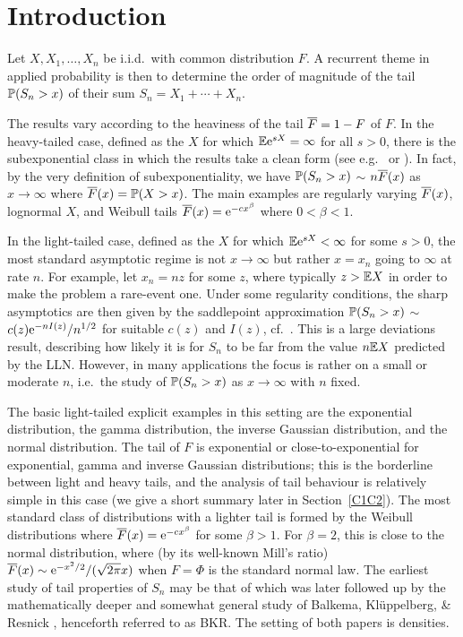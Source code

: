 \section{Introduction}\label{S:Intr}

Let $X,X_1,\ldots,X_n$ be i.i.d.\ with common distribution $F$. A recurrent theme in applied probability is then
to determine the order of magnitude of the tail $\mathbb{P}(S_n>x)$ of their sum $S_n=X_1+\cdots+X_n$.

The results vary according to the heaviness  of the tail $\overline F=1-F$ of $F$. In the heavy-tailed case, defined as the $X$ for which $\mathbb{E}\mathrm{e}^{sX}=\infty$ for all $s>0$, there is the subexponential class in which the results take a clean form (see e.g.\ \cite{EKM} or \cite{asmussen2010ruin}). In fact, by the
very definition of subexponentiality, we have $\mathbb{P}(S_n>x)$ $\sim$ $n\overline F(x)$ as $x\to\infty$ where $\overline F(x)=\mathbb{P}(X>x)$. The main examples are regularly varying $\overline F(x)$, lognormal $X$, and Weibull tails $\overline F(x)=\mathrm{e}^{-cx^\beta}$ where $0<\beta<1$.

In the light-tailed case, defined as the $X$ for which $\mathbb{E}\mathrm{e}^{sX}<\infty$ for some $s>0$, the most standard asymptotic regime is not $x\to\infty$ but rather
$x=x_n$ going to $\infty$ at rate $n$. For example, let $x_n=nz$ for some $z$, where typically $z>\mathbb{E} X$ in order to make the problem a rare-event one.
Under some regularity conditions, the sharp asymptotics are then given by the saddlepoint approximation $\mathbb{P}(S_n>x)$ $\sim$
$c(z)\mathrm{e}^{-nI(z)}/n^{1/2}$ for suitable $c(z)$ and $I(z)$, cf.\ \cite{JLJ}. This is a large deviations result, describing how likely
it is for $S_n$ to be far from the value $n\mathbb{E} X$ predicted by the LLN. However, in many applications the focus is rather on a small
or moderate $n$, i.e.\ the study of  $\mathbb{P}(S_n>x)$ as $x\to\infty$ with $n$ fixed.

The basic light-tailed explicit examples in this setting are the exponential distribution, the gamma distribution,
the inverse Gaussian distribution,  and the normal distribution. The tail of $F$ is exponential or close-to-exponential for exponential, gamma and inverse Gaussian distributions; this is the borderline between light and heavy tails, and the analysis of tail behaviour is relatively simple in this case (we give a short summary
later in Section~\ref{C1C2}).
The most standard class of distributions with a lighter tail is formed by the Weibull distributions where
$\overline F(x)=\mathrm{e}^{-cx^\beta}$ for some $\beta>1$. For $\beta=2$, this is close to the normal distribution, where (by its well-known Mill's ratio) $\overline F(x)\sim \mathrm{e}^{-x^2/2}/(\sqrt{2\pi}x)$ when $F = \Phi$ is the standard normal law. The earliest study of  tail properties of $S_n$ may be that
of \cite{Rootzen} which was later followed up by the mathematically deeper and somewhat general study of Balkema, Kl\"uppelberg, \& Resnick \cite{balkema1993densities}, henceforth referred to as BKR. The setting of both papers is densities.

